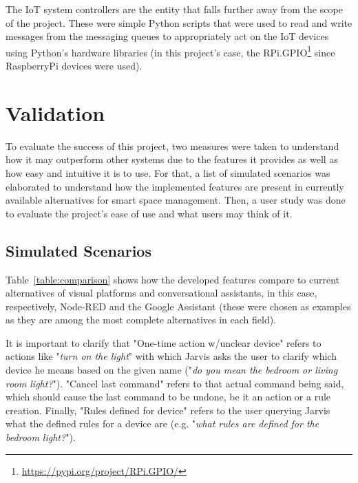 \documentclass[runningheads]{llncs}
\begin{document}
The IoT system controllers are the entity that falls further away from the scope of the project. These were simple Python scripts that were used to read and write messages from the messaging queues to appropriately act on the IoT devices using Python's hardware libraries (in this project's case, the RPi.GPIO\footnote{\url{https://pypi.org/project/RPi.GPIO/}} since RaspberryPi devices were used).

\section{Validation}

To evaluate the success of this project, two measures were taken to understand how it may outperform other systems due to the features it provides as well as how easy and intuitive it is to use. For that, a list of simulated scenarios was elaborated to understand how the implemented features are present in currently available alternatives for smart space management. Then, a user study was done to evaluate the project's ease of use and what users may think of it.

\subsection{Simulated Scenarios}

Table~\ref{table:comparison} shows how the developed features compare to current alternatives of visual platforms and conversational assistants, in this case, respectively, Node-RED and the Google Assistant (these were chosen as examples as they are among the most complete alternatives in each field).

It is important to clarify that "One-time action w/unclear device" refers to actions like "\textit{turn on the light}" with which Jarvis asks the user to clarify which device he means based on the given name ("\textit{do you mean the bedroom or living room light?}"). "Cancel last command" refers to that actual command being said, which should cause the last command to be undone, be it an action or a rule creation. Finally, "Rules defined for device" refers to the user querying Jarvis what the defined rules for a device are (e.g. "\textit{what rules are defined for the bedroom light?}").
\end{document}
